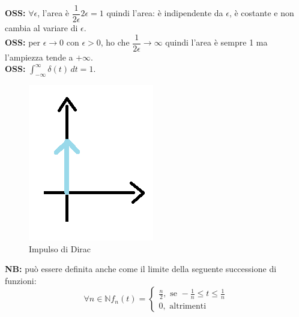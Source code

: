 	\textbf{OSS:} $ \forall \epsilon$, l'area è $\dfrac{1}{2 \epsilon} 2 \epsilon= 1 $ quindi l'area: è indipendente da $ \epsilon$, è costante e non cambia al variare di $ \epsilon $.\\
	
	\textbf{OSS:} per $ \epsilon \rightarrow 0 $ con $ \epsilon > 0 $, ho che $\dfrac{1}{2 \epsilon} \rightarrow \infty $ quindi l'area è sempre 1 ma l'ampiezza tende a $ + \infty $.\\
	
	\textbf{OSS:} $  \int_{ -\infty}^{ \infty} \delta(t)  \, dt = 1   $.\\
	
	\begin{figure}[h]
		\centering
		\includegraphics[scale=0.5]{immagini/delta}
		\caption{ Impulso di Dirac }
		\label{fig: delta}
	\end{figure}
	
	\textbf{NB:} può essere definita anche come il limite della seguente successione di funzioni:\\
	\begin{equation*}
	\forall n \in \mathbb{N} f_n(t)=
	\begin{cases} 
	\frac{n}{2}, \mbox{ se } -\frac{1}{n}\leq t \leq \frac{1}{n}\\
	0, \mbox{ altrimenti }
	\end{cases} 
	\end{equation*}
	
\pagebreak

